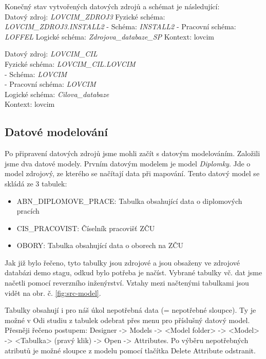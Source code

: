  \par Konečný stav vytvořených datových zdrojů a schémat je následující: \\

Datový zdroj: \textit{LOVCIM\_ZDROJ3} \newline
Fyzické schéma: \textit{LOVCIM\_ZDROJ3.INSTALL2}\newline
- Schéma: \textit{INSTALL2}\newline
- Pracovní schéma: \textit{LOFFEL}\newline
Logické schéma: \textit{Zdrojova\_databaze\_SP}\newline
Kontext: lovcim \newline

Datový zdroj: \textit{LOVCIM\_CIL}\\
Fyzické schéma: \textit{LOVCIM\_CIL.LOVCIM}\\
- Schéma: \textit{LOVCIM}\\
- Pracovní schéma: \textit{LOVCIM}\\
Logické schéma: \textit{Cilova\_databaze}\\
Kontext: lovcim\\
 
 
\subsection{Datové modelování}
 \par Po připravení datových zdrojů jsme mohli začít s datovým modelováním. Založili jsme dva datové modely. Prvním datovým modelem je model \textit{Diplomky}. Jde o model zdrojový, ze kterého se načítají data při mapování. Tento datový model se skládá ze 3 tabulek: 
\begin{itemize}
    \item ABN\_DIPLOMOVE\_PRACE: Tabulka obsahující data o diplomových pracích
    \item CIS\_PRACOVIST: Číselník pracovišť ZČU
    \item OBORY: Tabulka obsahující data o oborech na ZČU 
\end{itemize}

Jak již bylo řečeno, tyto tabulky jsou zdrojové a jsou obsaženy ve zdrojové databázi demo stagu, odkud bylo potřeba je načíst. Vybrané tabulky vč. dat jsme načetli pomocí reverzního inženýrství. Vztahy mezi načtenými tabulkami jsou vidět na obr. č. \ref{fig:src-model}. 

Tabulky obsahují i pro náš úkol nepotřebná data (= nepotřebné sloupce). Ty je možné v Odi studiu z tabulek odebrat přes menu pro příslušný datový model. Přesněji řečeno postupem: Designer -> Models -> <Model folder> -> <Model> -> <Tabulka> (pravý klik) -> Open -> Attributes.
Po výběru nepotřebných atributů je možné sloupce z modelu pomocí tlačítka Delete Attribute odstranit. 

